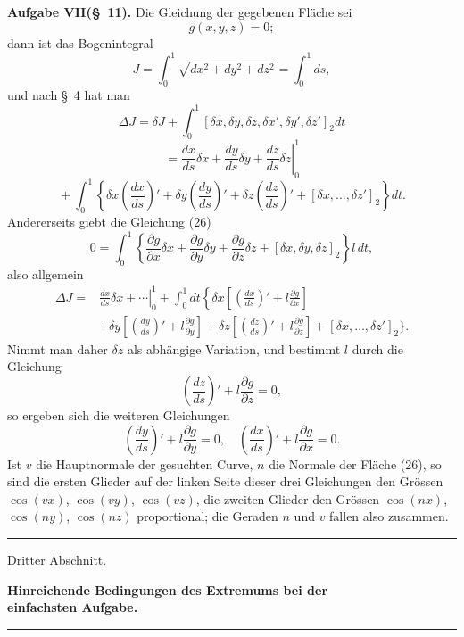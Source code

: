 \documentclass[11pt,a4paper,leqno]{article}
\begin{document}
\medskip
\noindent\textbf{Aufgabe VII(\S~11).} Die Gleichung der gegebenen Fläche sei
\begin{equation}\tag{26}
g(x,y,z)=0;
\end{equation}
dann ist das Bogenintegral
\[
J=\int_0^1\sqrt{dx^2+dy^2+dz^2}=\int_0^1ds,
\]
und nach \S~4 hat man
\[
\Delta J=\delta J+\int_0^1[\delta x,\delta y,\delta z,\delta x',\delta y',\delta z']_2dt
\]
\[
{}=\left.\frac{dx}{ds}\delta x+\frac{dy}{ds}\delta y+\frac{dz}{ds}\delta z\right|_0^1
\]
\[
{}+\int_0^1\left\{\delta x\left(\frac{dx}{ds}\right)'+\delta y\left(\frac{dy}{ds}\right)'+\delta z\left(\frac{dz}{ds}\right)'+[\delta x,\ldots,\delta z']_2\right\}dt.
\]
Andererseits giebt die Gleichung (26)
\[
0=\int_0^1\left\{\frac{\partial g}{\partial x}\delta x+\frac{\partial g}{\partial y}\delta y+\frac{\partial g}{\partial z}\delta z+[\delta x,\delta y,\delta z]_2\right\}l\,dt,
\]
also allgemein
\[
\begin{split}
\Delta J={}&\left.\frac{dx}{ds}\delta x+\cdots\right|_0^1+\int_0^1dt\left\{\delta x\left[\left(\frac{dx}{ds}\right)'+l\frac{\partial g}{\partial x}\right]
\right.\\
&+\delta y\left[\left(\frac{dy}{ds}\right)'+l\frac{\partial g}{\partial y}\right]
+\delta z\left[\left(\frac{dz}{ds}\right)'+l\frac{\partial g}{\partial z}\right]
+[\delta x,\ldots,\delta z']_2\Bigg\}.
\end{split}
\]
Nimmt man daher $\delta z$ als abhängige Variation, und bestimmt $l$ durch die Gleichung
\[
\left(\frac{dz}{ds}\right)'+l\frac{\partial g}{\partial z}=0,
\]
so ergeben sich die weiteren Gleichungen
\[
\left(\frac{dy}{ds}\right)'+l\frac{\partial g}{\partial y}=0,\quad
\left(\frac{dx}{ds}\right)'+l\frac{\partial g}{\partial x}=0.
\]
Ist $v$ die Hauptnormale der gesuchten Curve, $n$ die Normale der Fläche (26), so sind die ersten Glieder auf der linken Seite dieser drei Gleichungen den Grössen $\cos(vx)$, $\cos(vy)$, $\cos(vz)$, die zweiten Glieder den Grössen $\cos(nx)$, $\cos(ny)$, $\cos(nz)$ proportional; die Geraden $n$ und $v$ fallen also zusammen.

\begin{center}\rule{38mm}{0.4pt}\end{center}

\clearpage

\begin{center}
{\large Dritter Abschnitt.}\par
\vspace{0.8em}
{\Large\bfseries Hinreichende Bedingungen des Extremums bei der\\ einfachsten Aufgabe.}\par
\vspace{1.0em}\rule{38mm}{0.4pt}
\end{center}
\end{document}
